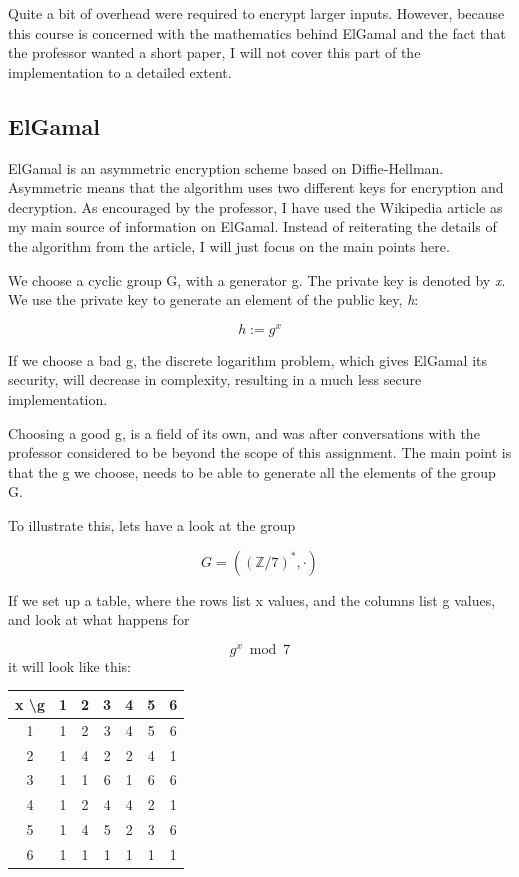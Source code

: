 \documentclass{article}
\begin{document}
Quite a bit of overhead were required to encrypt larger inputs. However, because this course is concerned with the mathematics behind ElGamal and the fact that the professor wanted a short paper, I will not cover this part of the implementation to a detailed extent.

\subsection{ElGamal}
ElGamal is an asymmetric encryption scheme based on Diffie-Hellman. Asymmetric means that the algorithm uses two different keys for encryption and decryption. As encouraged by the professor, I have used the Wikipedia article\cite{WIKI} as my main source of information on ElGamal. Instead of reiterating the details of the algorithm from the article, I will just focus on the main points here.

We choose a cyclic group G, with a generator g. The private key is denoted by \textit{x}. We use the private key to generate an element of the public key, \textit{h}:

\begin{equation*}
h := g^{x}
\end{equation*}

If we choose a bad g, the discrete logarithm problem, which gives ElGamal its security, will decrease in complexity, resulting in a much less secure implementation.

Choosing a good g, is a field of its own, and was after conversations with the professor considered to be beyond the scope of this assignment. The main point is that the g we choose, needs to be able to generate all the elements of the group G.

To illustrate this, lets have a look at the group

\begin{equation*}
  G =((\mathbb{Z}/7)^{*}, \cdot)
\end{equation*}


If we set up a table, where the rows list x values, and the columns list g values, and look at what happens for

\begin{equation*}
  g^{x} \bmod 7
\end{equation*}
it will look like this:

\begin{center}
 \begin{tabular}{||c|c c c c c c||}
 \hline
   x \textbackslash g & 1 & 2 & \textbf{3} & 4 & \textbf{5} & 6\\ [0.5ex]
 \hline
   1 & 1 & 2 & 3 & 4 & 5 & 6 \\
 \hline
   2 & 1 & 4 & 2 & 2 & 4 & 1 \\
 \hline
   3 & 1 & 1 & 6 & 1 & 6 & 6 \\
 \hline
   4 & 1 & 2 & 4 & 4 & 2 & 1 \\
 \hline
   5 & 1 & 4 & 5 & 2 & 3 & 6 \\
 \hline
   6 & 1 & 1 & 1 & 1 & 1 & 1 \\ [1ex]
 \hline
\end{tabular}
\end{center}
\end{document}
